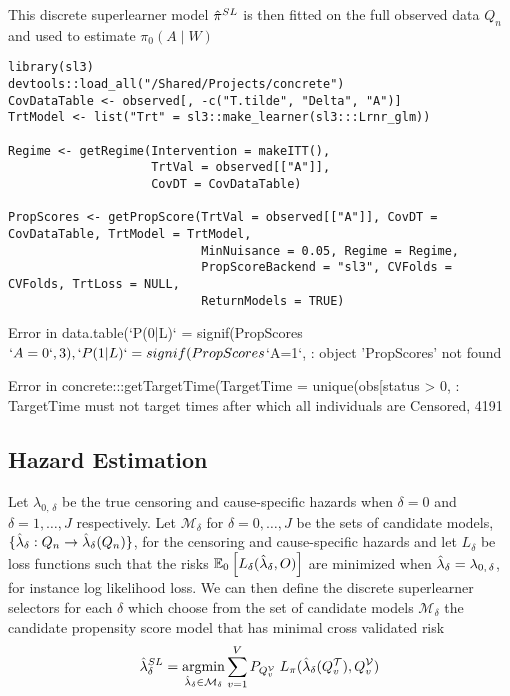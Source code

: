 \documentclass{report}
\newcommand{\1}{\ensuremath{\mathbf{1}}}
\DeclareMathOperator*{\argmin}{argmin}
\newcommand{\X}{\ensuremath{{W}}}
\newcommand{\g}{\ensuremath{\pi}}
\begin{document}
This discrete superlearner model \(\Hat{\g}^{SL}\) is then fitted on the full observed data \(Q_n\) and used to estimate \(\g_0(A \mid \X)\)


\begin{lstlisting}
library(sl3)
devtools::load_all("/Shared/Projects/concrete")
CovDataTable <- observed[, -c("T.tilde", "Delta", "A")]
TrtModel <- list("Trt" = sl3::make_learner(sl3:::Lrnr_glm))

Regime <- getRegime(Intervention = makeITT(),
                    TrtVal = observed[["A"]],
                    CovDT = CovDataTable)

PropScores <- getPropScore(TrtVal = observed[["A"]], CovDT = CovDataTable, TrtModel = TrtModel,
                           MinNuisance = 0.05, Regime = Regime,
                           PropScoreBackend = "sl3", CVFolds = CVFolds, TrtLoss = NULL, 
                           ReturnModels = TRUE)
\end{lstlisting}


Error in data.table(`P(0|L)` = signif(PropScores\(`A=0`, 3), `P(1|L)` = signif(PropScores\)`A=1`,  : 
  object 'PropScores' not found

Error in concrete:::getTargetTime(TargetTime = unique(obs[status > 0, : TargetTime must not target times after which all individuals are Censored, 4191

\subsection{Hazard Estimation}
\label{sec:org91ec76f}
Let \(\lambda_{0,\,\delta}\) be the true censoring and cause-specific hazards when \(\delta = 0\) and \(\delta = 1, \dots, J\) respectively. Let \(\mathcal{M}_\delta\) for \(\delta = 0, \dots, J\) be the sets of candidate models, \(\{\Hat{\lambda}_\delta : Q_n \to \Hat{\lambda}_\delta(Q_n)\}\), for the censoring and cause-specific hazards and let \(L_\delta\) be loss functions such that the risks \(\mathbb{E}_0\left[L_\delta(\Hat{\lambda}_\delta, O)\right]\) are minimized when \(\Hat{\lambda}_\delta = \lambda_{0,\,\delta}\), for instance log likelihood loss. We can then define the discrete superlearner selectors for each \(\delta\) which choose from the set of candidate models \(\mathcal{M_\delta}\) the candidate propensity score model that has minimal cross validated risk 
\[ \Hat{\lambda}_\delta^{SL} = \argmin_{\Hat{\lambda}_\delta \in \mathcal{M}_\delta} \sum_{v = 1}^{V} P_{Q^\mathcal{V}_v} \; L_\g(\Hat{\lambda}_\delta(Q^\mathcal{T}_v), Q^\mathcal{V}_v)\]
\end{document}
